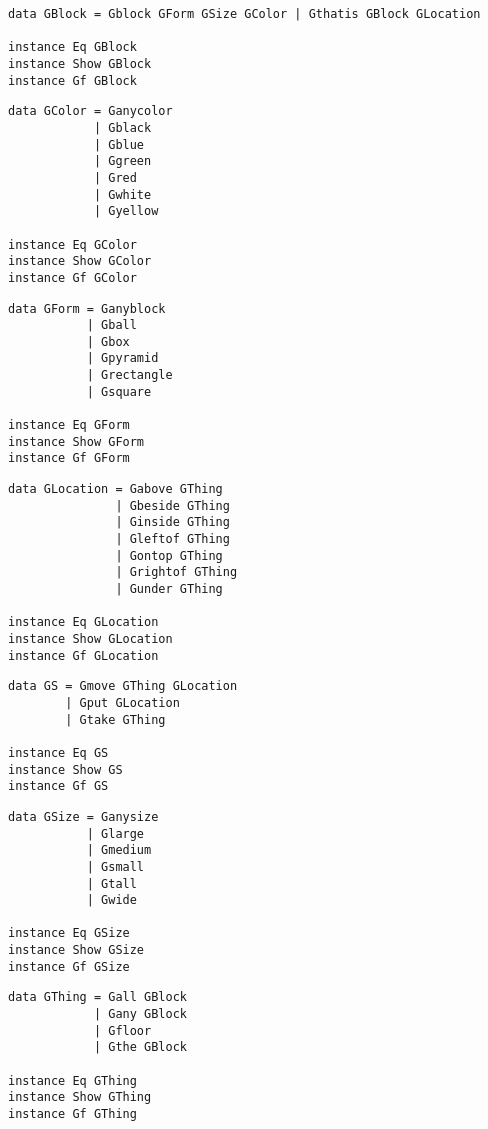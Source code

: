 \begin{verbatim}
data GBlock = Gblock GForm GSize GColor | Gthatis GBlock GLocation

instance Eq GBlock
instance Show GBlock
instance Gf GBlock
\end{verbatim}
\begin{verbatim}
data GColor = Ganycolor
            | Gblack
            | Gblue
            | Ggreen
            | Gred
            | Gwhite
            | Gyellow

instance Eq GColor
instance Show GColor
instance Gf GColor
\end{verbatim}
\begin{verbatim}
data GForm = Ganyblock
           | Gball
           | Gbox
           | Gpyramid
           | Grectangle
           | Gsquare

instance Eq GForm
instance Show GForm
instance Gf GForm
\end{verbatim}
\begin{verbatim}
data GLocation = Gabove GThing
               | Gbeside GThing
               | Ginside GThing
               | Gleftof GThing
               | Gontop GThing
               | Grightof GThing
               | Gunder GThing

instance Eq GLocation
instance Show GLocation
instance Gf GLocation
\end{verbatim}
\begin{verbatim}
data GS = Gmove GThing GLocation
        | Gput GLocation
        | Gtake GThing

instance Eq GS
instance Show GS
instance Gf GS
\end{verbatim}
\begin{verbatim}
data GSize = Ganysize
           | Glarge
           | Gmedium
           | Gsmall
           | Gtall
           | Gwide
           
instance Eq GSize
instance Show GSize
instance Gf GSize
\end{verbatim}
\begin{verbatim}
data GThing = Gall GBlock
            | Gany GBlock
            | Gfloor
            | Gthe GBlock

instance Eq GThing
instance Show GThing
instance Gf GThing
\end{verbatim}
